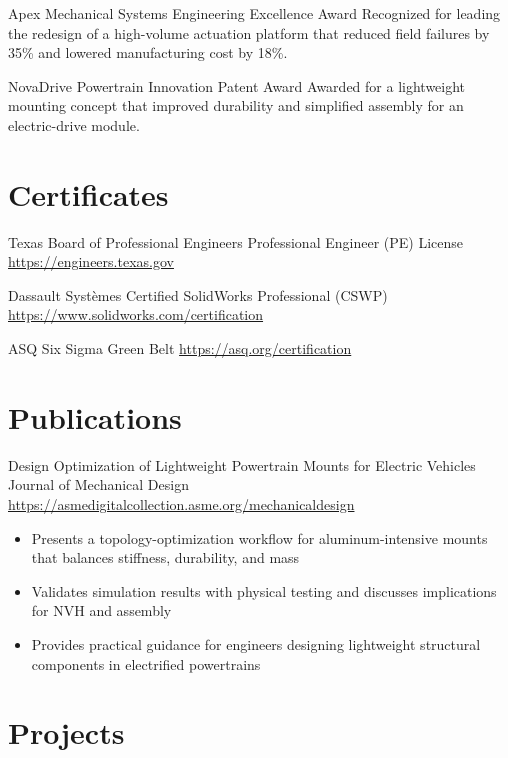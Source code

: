 \documentclass[a4paper, serif, 10pt]{moderncv}
\begin{document}
        {Apex Mechanical Systems}
        {Engineering Excellence Award}
        {}
        {}
        {Recognized for leading the redesign of a high-volume actuation platform that reduced field failures by 35\% and lowered manufacturing cost by 18\%.}

        {NovaDrive Powertrain}
        {Innovation Patent Award}
        {}
        {}
        {Awarded for a lightweight mounting concept that improved durability and simplified assembly for an electric-drive module.}
\section{Certificates}

        {Texas Board of Professional Engineers}
        {Professional Engineer (PE) License}
        {\url{https://engineers.texas.gov}}
        {}
        {}

        {Dassault Systèmes}
        {Certified SolidWorks Professional (CSWP)}
        {\url{https://www.solidworks.com/certification}}
        {}
        {}

        {ASQ}
        {Six Sigma Green Belt}
        {\url{https://asq.org/certification}}
        {}
        {}
\section{Publications}

        {Design Optimization of Lightweight Powertrain Mounts for Electric Vehicles}
        {Journal of Mechanical Design}
        {\url{https://asmedigitalcollection.asme.org/mechanicaldesign}}
        {}
        {\begin{itemize}
\item Presents a topology-optimization workflow for aluminum-intensive mounts that balances stiffness, durability, and mass
\item Validates simulation results with physical testing and discusses implications for NVH and assembly
\item Provides practical guidance for engineers designing lightweight structural components in electrified powertrains
\end{itemize}}
\section{Projects}
\end{document}
